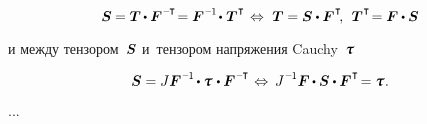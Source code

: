 \begin{otherlanguage}{russian}
\nopagebreak\vspace{-0.12em}\begin{equation*}
\secondpiolakirchhoffstress \hspace{-0.1ex}
= \firstpiolakirchhoffstress \hspace{-0.1ex} \dotp \bm{F}^{\hspace{.1ex}\expminusT} \hspace{-0.4ex}
= \bm{F}^{\hspace{.1ex}\expminusone} \hspace{-0.3ex} \dotp \hspace{.1ex} \firstpiolakirchhoffstress^{\hspace{.1ex}\T}
%
\hspace{.25ex} \Leftrightarrow \hspace{.75ex}
%
\firstpiolakirchhoffstress = \secondpiolakirchhoffstress \dotp \bm{F}^{\hspace{.1ex}\T}
\hspace{-0.4ex} , \:\:
\firstpiolakirchhoffstress^{\hspace{.1ex}\T} \hspace{-0.4ex} = \bm{F} \dotp \secondpiolakirchhoffstress
\end{equation*}

\vspace{-0.2em} \noindent и между тензором~$\bm{S}$ и~тензором напряжения Cauchy~$\cauchystress$

\nopagebreak\vspace{-0.12em}\begin{equation*}
\secondpiolakirchhoffstress = J \bm{F}^{\hspace{.1ex}\expminusone} \hspace{-0.2ex} \dotp \cauchystress \hspace{.16ex} \dotp \bm{F}^{\hspace{.1ex}\expminusT}
\hspace{.2ex} \Leftrightarrow \hspace{.5ex}
J^{\hspace{.12ex}\expminusone} \bm{F} \hspace{-0.1ex} \dotp \secondpiolakirchhoffstress \dotp \bm{F}^{\hspace{.1ex}\T} \hspace{-0.32ex}
= \cauchystress \hspace{.1ex}.
\end{equation*}

...


\end{otherlanguage}
